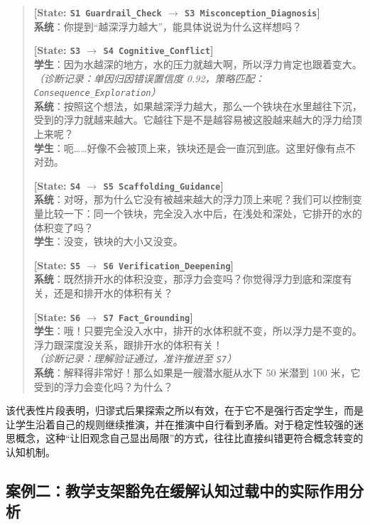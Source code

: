 \begin{quote}
\textbf{[State: \texttt{S1 Guardrail\_Check} $\rightarrow$ \texttt{S3 Misconception\_Diagnosis}]} \\
\textbf{系统}：你提到“越深浮力越大”，能具体说说为什么这样想吗？ 

\textbf{[State: \texttt{S3} $\rightarrow$ \texttt{S4 Cognitive\_Conflict}]} \\
\textbf{学生}：因为水越深的地方，水的压力就越大啊，所以浮力肯定也跟着变大。\\
\textit{（诊断记录：单因归因错误置信度 0.92，策略匹配：\texttt{Consequence\_Exploration}）} \\
\textbf{系统}：按照这个想法，如果越深浮力越大，那么一个铁块在水里越往下沉，受到的浮力就越来越大。它越往下是不是越容易被这股越来越大的浮力给顶上来呢？ \\
\textbf{学生}：呃……好像不会被顶上来，铁块还是会一直沉到底。这里好像有点不对劲。

\textbf{[State: \texttt{S4} $\rightarrow$ \texttt{S5 Scaffolding\_Guidance}]} \\
\textbf{系统}：对呀，那为什么它没有被越来越大的浮力顶上来呢？我们可以控制变量比较一下：同一个铁块，完全没入水中后，在浅处和深处，它排开的水的体积变了吗？ \\
\textbf{学生}：没变，铁块的大小又没变。

\textbf{[State: \texttt{S5} $\rightarrow$ \texttt{S6 Verification\_Deepening}]} \\
\textbf{系统}：既然排开水的体积没变，那浮力会变吗？你觉得浮力到底和深度有关，还是和排开水的体积有关？

\textbf{[State: \texttt{S6} $\rightarrow$ \texttt{S7 Fact\_Grounding}]} \\
\textbf{学生}：哦！只要完全没入水中，排开的水体积就不变，所以浮力是不变的。浮力跟深度没关系，跟排开水的体积有关！\\
\textit{（诊断记录：理解验证通过，准许推进至 \texttt{S7}）} \\
\textbf{系统}：解释得非常好！那么如果是一艘潜水艇从水下 50 米潜到 100 米，它受到的浮力会变化吗？为什么？
\end{quote}

该代表性片段表明，归谬式后果探索之所以有效，在于它不是强行否定学生，而是让学生沿着自己的规则继续推演，并在推演中自行看到矛盾。对于稳定性较强的迷思概念，这种“让旧观念自己显出局限”的方式，往往比直接纠错更符合概念转变的认知机制\cite{posner1982accommodation,chi1994things}。

\subsection{案例二：教学支架豁免在缓解认知过载中的实际作用分析}
\label{sec:4.6.2}

